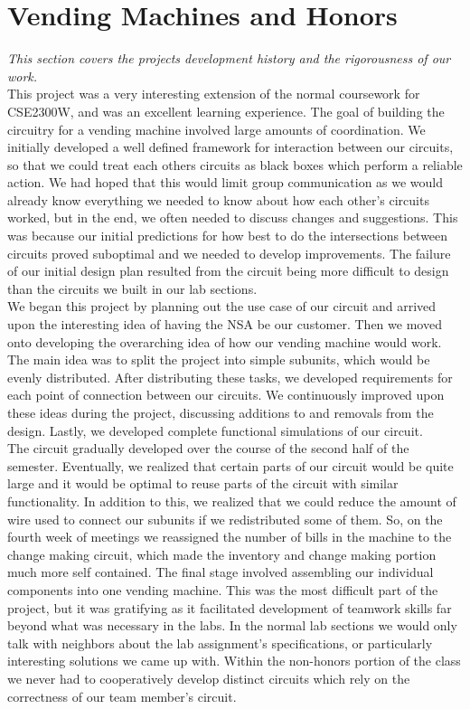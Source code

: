 \section{Vending Machines and Honors}
\emph{This section covers the projects development history and the rigorousness of our work.}\\  


This project was a very interesting extension of the normal coursework
for CSE2300W, and was an excellent learning experience. The goal of 
building the circuitry for a vending machine involved large amounts of 
coordination. We initially developed a well defined framework for 
interaction between our circuits, so that we could treat each others 
circuits as black boxes which perform a reliable action. We had 
hoped that this would limit group communication as we would already know 
everything we needed to know about how each other's circuits worked, 
but in the end, we often needed to discuss changes and suggestions. This 
was because our initial predictions for how best to do the 
intersections between circuits proved suboptimal and we needed to develop 
improvements. The failure of our initial design plan resulted from the 
circuit being more difficult to design than the circuits we built in our 
lab sections.\\


We began this project by planning out the use case of our circuit and
arrived upon the interesting idea of having the NSA be our customer. Then 
we moved onto developing the overarching idea of how our vending machine 
would work. The main idea was to split the project into simple subunits, 
which would be evenly distributed. After distributing these tasks, we 
developed requirements for each point of connection between our circuits. 
We continuously improved upon these ideas during the project, discussing 
additions to and removals from the design. Lastly, we developed complete 
functional simulations of our circuit.\\


The circuit gradually developed over the course of the second half of the 
semester. Eventually, we realized that certain parts of our circuit would 
be quite large and it would be optimal to reuse parts of the circuit with
similar functionality. In addition to this, we realized that we could 
reduce the amount of wire used to connect our subunits if we redistributed
some of them. So, on the fourth week of meetings we reassigned the 
number of bills in the machine to the change making circuit, which made the
inventory and change making portion much more self contained. The final 
stage involved assembling our individual components into one vending 
machine. This was the most difficult part of the project, but it was 
gratifying as it facilitated development of teamwork skills far beyond what 
was necessary in the labs. In the normal lab sections we would only talk
with neighbors about the lab assignment's specifications, or particularly 
interesting solutions we came up with. Within the non-honors portion of 
the class we never had to cooperatively develop distinct circuits which 
rely on the correctness of our team member's circuit.\\


